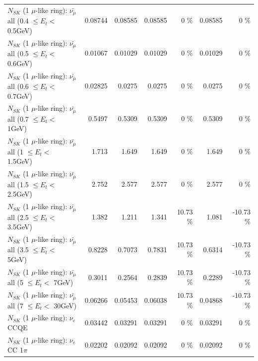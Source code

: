 \begin{table}
\begin{tabular}{| l | r | r | r  r | r  r |}
 $N_{SK}$ (1 $\mu$-like ring): $\bar{\nu_{\mu}}$ all (0.4 $\leq E_{t} <$ 0.5GeV) &         0.08744 &         0.08585 &         0.08585 &        0 \%  &         0.08585 &        0 \%  \\ 
 $N_{SK}$ (1 $\mu$-like ring): $\bar{\nu_{\mu}}$ all (0.5 $\leq E_{t} <$ 0.6GeV) &         0.01067 &         0.01029 &         0.01029 &        0 \%  &         0.01029 &        0 \%  \\ 
 $N_{SK}$ (1 $\mu$-like ring): $\bar{\nu_{\mu}}$ all (0.6 $\leq E_{t} <$ 0.7GeV) &         0.02825 &          0.0275 &          0.0275 &        0 \%  &          0.0275 &        0 \%  \\ 
   $N_{SK}$ (1 $\mu$-like ring): $\bar{\nu_{\mu}}$ all (0.7 $\leq E_{t} <$ 1GeV) &          0.5497 &          0.5309 &          0.5309 &        0 \%  &          0.5309 &        0 \%  \\ 
   $N_{SK}$ (1 $\mu$-like ring): $\bar{\nu_{\mu}}$ all (1 $\leq E_{t} <$ 1.5GeV) &           1.713 &           1.649 &           1.649 &        0 \%  &           1.649 &        0 \%  \\ 
 $N_{SK}$ (1 $\mu$-like ring): $\bar{\nu_{\mu}}$ all (1.5 $\leq E_{t} <$ 2.5GeV) &           2.752 &           2.577 &           2.577 &        0 \%  &           2.577 &        0 \%  \\ 
 $N_{SK}$ (1 $\mu$-like ring): $\bar{\nu_{\mu}}$ all (2.5 $\leq E_{t} <$ 3.5GeV) &           1.382 &           1.211 &           1.341 &    10.73 \%  &           1.081 &   -10.73 \%  \\ 
   $N_{SK}$ (1 $\mu$-like ring): $\bar{\nu_{\mu}}$ all (3.5 $\leq E_{t} <$ 5GeV) &          0.8228 &          0.7073 &          0.7831 &    10.73 \%  &          0.6314 &   -10.73 \%  \\ 
     $N_{SK}$ (1 $\mu$-like ring): $\bar{\nu_{\mu}}$ all (5 $\leq E_{t} <$ 7GeV) &          0.3011 &          0.2564 &          0.2839 &    10.73 \%  &          0.2289 &   -10.73 \%  \\ 
    $N_{SK}$ (1 $\mu$-like ring): $\bar{\nu_{\mu}}$ all (7 $\leq E_{t} <$ 30GeV) &         0.06266 &         0.05453 &         0.06038 &    10.73 \%  &         0.04868 &   -10.73 \%  \\ 
\hline
\hline
\hline
                                      $N_{SK}$ (1 $\mu$-like ring): $\nu_e$ CCQE &         0.03442 &         0.03291 &         0.03291 &        0 \%  &         0.03291 &        0 \%  \\ 
                                 $N_{SK}$ (1 $\mu$-like ring): $\nu_e$ CC 1$\pi$ &         0.02202 &         0.02092 &         0.02092 &        0 \%  &         0.02092 &        0 \%  \\ 

\end{tabular}
\end{table}
